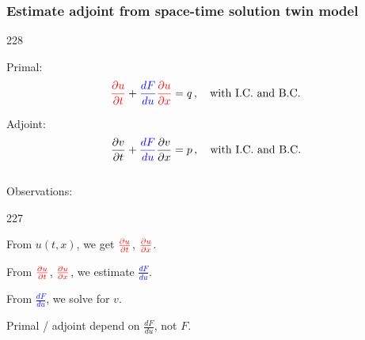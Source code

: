 \documentclass{beamer}
\newcommand{\barrow}{\item[\color{darkred}\ding{228}]}
\newcommand{\carrow}{\item[\color{darkred}\ding{227}]}
\begin{document}
\begin{frame}
    \frametitle{Estimate adjoint from space-time solution \hfill \scriptsize{twin model}} \small
    \begin{dinglist}{228}
        \barrow Primal:
        $$
            \textcolor{red}{\frac{\partial u}{\partial t}} + \textcolor{blue}{\frac{d F}{d u}} \textcolor{red}{\frac{\partial u}{\partial x}} = q \,,
            \quad \textrm{with I.C. and B.C.}
        $$
        \barrow
        Adjoint:
        $$
            \frac{\partial v}{\partial t} + \textcolor{blue}{\frac{dF}{du}} \frac{\partial v}{\partial x} = p\,,
            \quad \textrm{with I.C. and B.C.}
        $$\\
        \vspace{.3cm}
        Observations:\\
        \vspace{.2cm}
        \begin{dinglist}{227}
            \carrow From $u(t,x)$, we get
            $\textcolor{red}{\frac{\partial u}{\partial t}}$, 
            $\textcolor{red}{\frac{\partial u}{\partial x}}$.
  
            \vspace{.3cm}
            \carrow From 
            $\textcolor{red}{\frac{\partial u}{\partial t}}$, 
            $\textcolor{red}{\frac{\partial u}{\partial x}}$, we
            estimate \textcolor{blue}{$\frac{dF}{du}$}. 

            \vspace{.3cm}
            \carrow From \textcolor{blue}{$\frac{dF}{du}$}, we solve for $v$.

            \vspace{.3cm}
            \carrow Primal / adjoint depend on {$\frac{dF}{du}$}, not $F$.
        \end{dinglist}
    \end{dinglist}
    
\end{frame}
\end{document}
